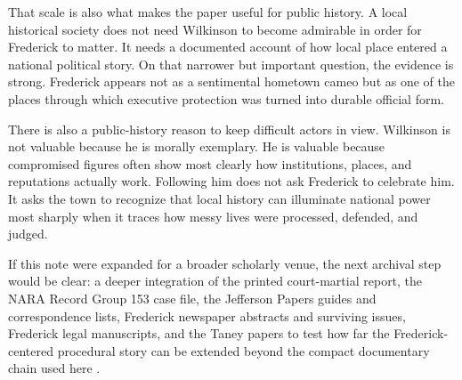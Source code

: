 That scale is also what makes the paper useful for public history. A local historical society does not need Wilkinson to become admirable in order for Frederick to matter. It needs a documented account of how local place entered a national political story. On that narrower but important question, the evidence is strong. Frederick appears not as a sentimental hometown cameo but as one of the places through which executive protection was turned into durable official form.

There is also a public-history reason to keep difficult actors in view. Wilkinson is not valuable because he is morally exemplary. He is valuable because compromised figures often show most clearly how institutions, places, and reputations actually work. Following him does not ask Frederick to celebrate him. It asks the town to recognize that local history can illuminate national power most sharply when it traces how messy lives were processed, defended, and judged.

If this note were expanded for a broader scholarly venue, the next archival step would be clear: a deeper integration of the printed court-martial report, the NARA Record Group 153 case file, the Jefferson Papers guides and correspondence lists, Frederick newspaper abstracts and surviving issues, Frederick legal manuscripts, and the Taney papers to test how far the Frederick-centered procedural story can be extended beyond the compact documentary chain used here \citep{morgancourtmartial1812,nara153,locjeffersonpapers,locjeffersonwilkinsonlist,locjeffersonwilkinson1811list,wright1992,uvataneypapers}.

